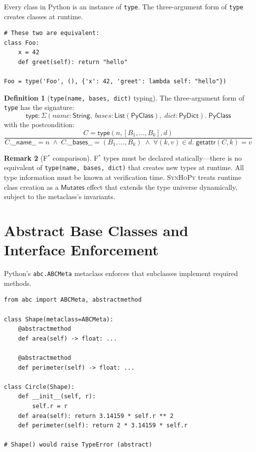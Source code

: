 \documentclass[11pt,a4paper]{report}
\theoremstyle{definition}
\newtheorem{definition}{Definition}[chapter]
\newtheorem{remark}[definition]{Remark}
\theoremstyle{plain}
\newcommand{\PyClass}{\mathsf{PyClass}}
\newcommand{\PyDict}{\mathsf{PyDict}}
\newcommand{\Mutates}{\mathsf{Mutates}}
\newcommand{\fstar}{F$^{*}$}
\newcommand{\synhopy}{\textsc{SynHoPy}}
\begin{document}
Every class in Python is an instance of \lstinline[style=python]{type}.
The three-argument form of \lstinline[style=python]{type} creates classes
at runtime.

\begin{lstlisting}[style=python]
# These two are equivalent:
class Foo:
    x = 42
    def greet(self): return "hello"

Foo = type('Foo', (), {'x': 42, 'greet': lambda self: "hello"})
\end{lstlisting}

\begin{definition}[\texttt{type(name, bases, dict)} typing]
\label{def:type-three-arg}
The three-argument form of \lstinline[style=python]{type} has the signature:
\[
  \mathsf{type} : \Sigma(\mathit{name} : \mathsf{String},\;
    \mathit{bases} : \mathsf{List}(\PyClass),\;
    \mathit{dict} : \PyDict).\; \PyClass
\]
with the postcondition:
\[
  \frac{
    C = \mathsf{type}(n, [B_1, \ldots, B_k], d)
  }{
    C.\mathsf{\_\_name\_\_} = n \;\wedge\;
    C.\mathsf{\_\_bases\_\_} = (B_1, \ldots, B_k) \;\wedge\;
    \forall (k,v) \in d.\; \mathsf{getattr}(C, k) = v
  }
\]
\end{definition}

\begin{remark}[\fstar{} comparison]
\fstar{} types must be declared statically---there is no equivalent of
\lstinline[style=python]{type(name, bases, dict)} that creates new types
at runtime.  All type information must be known at verification time.
\synhopy{} treats runtime class creation as a $\Mutates$ effect that
extends the type universe dynamically, subject to the metaclass's
invariants.
\end{remark}

\section{Abstract Base Classes and Interface Enforcement}

Python's \lstinline[style=python]{abc.ABCMeta} metaclass enforces that
subclasses implement required methods.

\begin{lstlisting}[style=python]
from abc import ABCMeta, abstractmethod

class Shape(metaclass=ABCMeta):
    @abstractmethod
    def area(self) -> float: ...

    @abstractmethod
    def perimeter(self) -> float: ...

class Circle(Shape):
    def __init__(self, r):
        self.r = r
    def area(self): return 3.14159 * self.r ** 2
    def perimeter(self): return 2 * 3.14159 * self.r

# Shape() would raise TypeError (abstract)
\end{lstlisting}
\end{document}
